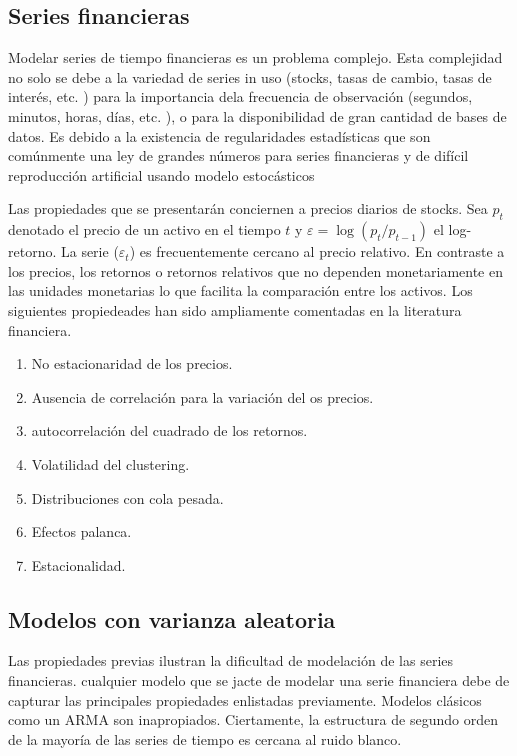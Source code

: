 \documentclass[a4paper, 11pt]{article}
\begin{document}
\subsection{Series financieras}
Modelar series de tiempo financieras es un problema complejo. Esta complejidad no solo se debe a la variedad de series in uso (stocks, tasas de cambio, tasas de interés, etc. ) para la importancia dela frecuencia de observación (segundos, minutos, horas, días, etc. ), o para la disponibilidad de gran cantidad de bases de datos. Es debido a la existencia de regularidades estadísticas que son comúnmente una ley de grandes números para series financieras y de difícil reproducción artificial usando modelo estocásticos

Las propiedades que se presentarán conciernen a precios diarios de stocks. Sea $p_t$ denotado el precio de un activo en el tiempo $t$ y $\varepsilon = \log(p_t/p_{t- 1})$ el log-retorno. La serie ($\varepsilon_t$) es frecuentemente cercano al precio relativo. En contraste a los precios, los retornos o retornos relativos que no dependen monetariamente en las unidades monetarias lo que facilita la comparación entre los activos. Los siguientes propiedeades han sido ampliamente comentadas en la literatura financiera.
\begin{enumerate}
  \item No estacionaridad de los precios.
  \item Ausencia de correlación para la variación del os precios.
  \item autocorrelación del cuadrado de los retornos.
  \item Volatilidad del clustering.
  \item Distribuciones con cola pesada.
  \item Efectos palanca.
  \item Estacionalidad.
\end{enumerate}

\subsection{Modelos con varianza aleatoria}

Las propiedades previas ilustran la dificultad de modelación de las series financieras. cualquier modelo que se jacte de modelar una serie financiera debe de capturar las principales propiedades enlistadas previamente. Modelos clásicos como un ARMA son inapropiados. Ciertamente, la estructura de segundo orden de la mayoría de las series de tiempo es cercana al ruido blanco.
\end{document}
